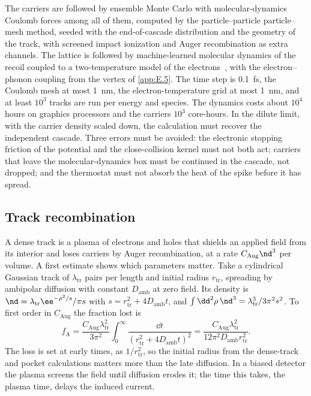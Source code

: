The carriers are followed by ensemble Monte Carlo with molecular-dynamics Coulomb forces among all of them, computed by the particle--particle particle--mesh method, seeded with the end-of-cascade distribution and the geometry of the track, with screened impact ionization and Auger recombination as extra channels. The lattice is followed by machine-learned molecular dynamics of the recoil coupled to a two-temperature model of the electrons~\cite{duffy2007including}, with the electron--phonon coupling from the vertex of \cref{app:E.5}. The time step is \SI{0.1}{fs}, the Coulomb mesh at most \SI{1}{nm}, the electron-temperature grid at most \SI{1}{nm}, and at least $10^3$ tracks are run per energy and species. The dynamics costs about $10^4$ hours on graphics processors and the carriers $10^3$ core-hours. In the dilute limit, with the carrier density scaled down, the calculation must recover the independent cascade. Three errors must be avoided: the electronic stopping friction of the potential and the close-collision kernel must not both act; carriers that leave the molecular-dynamics box must be continued in the cascade, not dropped; and the thermostat must not absorb the heat of the spike before it has spread.

\subsection{Track recombination}

A dense track is a plasma of electrons and holes that shields an applied field from its interior and loses carriers by Auger recombination, at a rate $C_{\mathrm{Aug}}\nd^3$ per volume. A first estimate shows which parameters matter. Take a cylindrical Gaussian track of $\lambda_{\mathrm{tr}}$ pairs per length and initial radius $r_{\mathrm{tr}}$, spreading by ambipolar diffusion with constant $D_{\mathrm{amb}}$ at zero field. Its density is $\nd = \lambda_{\mathrm{tr}}\ee^{-\rho^2/s}/\pi s$ with $s = r_{\mathrm{tr}}^2 + 4D_{\mathrm{amb}}t$, and $\int\dd^2\rho\,\nd^3 = \lambda_{\mathrm{tr}}^3/3\pi^2s^2$. To first order in $C_{\mathrm{Aug}}$ the fraction lost is
\begin{equation}
  f_{\mathrm{A}} = \frac{C_{\mathrm{Aug}}\lambda_{\mathrm{tr}}^2}{3\pi^2}\int_0^\infty\frac{\dd t}{(r_{\mathrm{tr}}^2 + 4D_{\mathrm{amb}}t)^2}
  = \frac{C_{\mathrm{Aug}}\lambda_{\mathrm{tr}}^2}{12\pi^2D_{\mathrm{amb}}r_{\mathrm{tr}}^2} .
  \label{eq:E.23-fA}
\end{equation}
The loss is set at early times, as $1/r_{\mathrm{tr}}^2$, so the initial radius from the dense-track and pocket calculations matters more than the late diffusion. In a biased detector the plasma screens the field until diffusion erodes it; the time this takes, the plasma time, delays the induced current.

